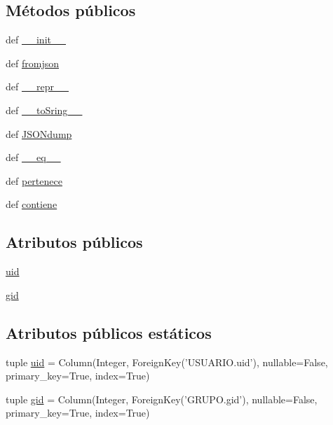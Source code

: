 \subsection*{Métodos públicos}
\begin{DoxyCompactItemize}
\item 
def \hyperlink{classdb__layer_1_1_groups_a7aa22d0c37d3330a08590a6af6260387}{\-\_\-\-\_\-init\-\_\-\-\_\-}
\item 
def \hyperlink{classdb__layer_1_1_groups_ad6c13cffa730507128cffd4401485225}{fromjson}
\item 
def \hyperlink{classdb__layer_1_1_groups_a8ce7c44c7a07175c805663313741c54e}{\-\_\-\-\_\-repr\-\_\-\-\_\-}
\item 
def \hyperlink{classdb__layer_1_1_groups_a42a22e15d4c61b933187e912db73be95}{\-\_\-\-\_\-to\-Sring\-\_\-\-\_\-}
\item 
def \hyperlink{classdb__layer_1_1_groups_a76ff037df6adbeec12fc23130f48c542}{J\-S\-O\-Ndump}
\item 
def \hyperlink{classdb__layer_1_1_groups_acb2877ad9f52af696b7a1b3d1c2ccce2}{\-\_\-\-\_\-eq\-\_\-\-\_\-}
\item 
def \hyperlink{classdb__layer_1_1_groups_ac11f473a264eb8924516c1e19053d571}{pertenece}
\item 
def \hyperlink{classdb__layer_1_1_groups_a654f6803bf6349c14312e034f3b7112e}{contiene}
\end{DoxyCompactItemize}
\subsection*{Atributos públicos}
\begin{DoxyCompactItemize}
\item 
\hyperlink{classdb__layer_1_1_groups_a392e40281e072b1c43e562928f656a1e}{uid}
\item 
\hyperlink{classdb__layer_1_1_groups_af0a5178fa5eced1a1d3ff053a8171bd6}{gid}
\end{DoxyCompactItemize}
\subsection*{Atributos públicos estáticos}
\begin{DoxyCompactItemize}
\item 
tuple \hyperlink{classdb__layer_1_1_groups_a14ee9c00efa52f89924369f75532c416}{uid} = Column(Integer, Foreign\-Key('U\-S\-U\-A\-R\-I\-O.\-uid'), nullable=False, primary\-\_\-key=True, index=True)
\item 
tuple \hyperlink{classdb__layer_1_1_groups_aded07ebac158a99bf9fd01c87bba222c}{gid} = Column(Integer, Foreign\-Key('G\-R\-U\-P\-O.\-gid'), nullable=False, primary\-\_\-key=True, index=True)
\end{DoxyCompactItemize}


